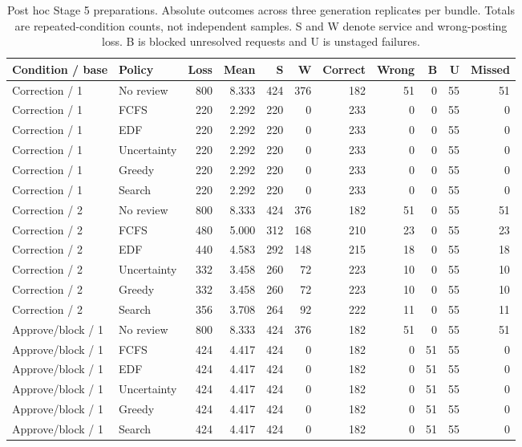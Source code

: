 \begin{table}[t]
\caption{Post hoc Stage 5 preparations. Absolute outcomes across three generation replicates per bundle. Totals are repeated-condition counts, not independent samples. S and W denote service and wrong-posting loss. B is blocked unresolved requests and U is unstaged failures.}
\centering\small
\begin{tabular}{llrrrrrrrrr}
\toprule
Condition / base & Policy & Loss & Mean & S & W & Correct & Wrong & B & U & Missed \\
\midrule
Correction / 1 & No review & 800 & 8.333 & 424 & 376 & 182 & 51 & 0 & 55 & 51 \\
Correction / 1 & FCFS & 220 & 2.292 & 220 & 0 & 233 & 0 & 0 & 55 & 0 \\
Correction / 1 & EDF & 220 & 2.292 & 220 & 0 & 233 & 0 & 0 & 55 & 0 \\
Correction / 1 & Uncertainty & 220 & 2.292 & 220 & 0 & 233 & 0 & 0 & 55 & 0 \\
Correction / 1 & Greedy & 220 & 2.292 & 220 & 0 & 233 & 0 & 0 & 55 & 0 \\
Correction / 1 & Search & 220 & 2.292 & 220 & 0 & 233 & 0 & 0 & 55 & 0 \\
Correction / 2 & No review & 800 & 8.333 & 424 & 376 & 182 & 51 & 0 & 55 & 51 \\
Correction / 2 & FCFS & 480 & 5.000 & 312 & 168 & 210 & 23 & 0 & 55 & 23 \\
Correction / 2 & EDF & 440 & 4.583 & 292 & 148 & 215 & 18 & 0 & 55 & 18 \\
Correction / 2 & Uncertainty & 332 & 3.458 & 260 & 72 & 223 & 10 & 0 & 55 & 10 \\
Correction / 2 & Greedy & 332 & 3.458 & 260 & 72 & 223 & 10 & 0 & 55 & 10 \\
Correction / 2 & Search & 356 & 3.708 & 264 & 92 & 222 & 11 & 0 & 55 & 11 \\
Approve/block / 1 & No review & 800 & 8.333 & 424 & 376 & 182 & 51 & 0 & 55 & 51 \\
Approve/block / 1 & FCFS & 424 & 4.417 & 424 & 0 & 182 & 0 & 51 & 55 & 0 \\
Approve/block / 1 & EDF & 424 & 4.417 & 424 & 0 & 182 & 0 & 51 & 55 & 0 \\
Approve/block / 1 & Uncertainty & 424 & 4.417 & 424 & 0 & 182 & 0 & 51 & 55 & 0 \\
Approve/block / 1 & Greedy & 424 & 4.417 & 424 & 0 & 182 & 0 & 51 & 55 & 0 \\
Approve/block / 1 & Search & 424 & 4.417 & 424 & 0 & 182 & 0 & 51 & 55 & 0 \\

\end{tabular}
\end{table}
